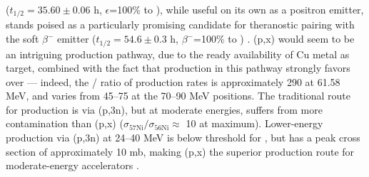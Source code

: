 \documentclass[3p]{elsarticle}
\begin{document}
 ($t_{1/2}=35.60\pm0.06$ h, $\epsilon$=100\% to  \cite{Bhat1998}), while useful on its own as a positron emitter, stands poised as a particularly promising candidate for theranostic pairing with the soft $\beta^-$ emitter  ($t_{1/2}=54.6\pm0.3$ h, $\beta^-$=100\% to  \cite{Browne2010a}) \cite{PMID:7632762,zweit1996medium,Graves2016,Rosch2014}. 
(p,x) would seem to be an intriguing production pathway, due to the ready availability of Cu metal as target, combined with the fact that production in this pathway strongly favors  over  --- indeed, the / 
ratio of production rates is approximately 290 at 61.58 MeV, and varies from 45--75 at the 70--90 MeV positions.
The traditional route for  production is via (p,3n), but at moderate energies, suffers from more   contamination than (p,x)  ($\sigma_\text{57Ni} / \sigma_\text{56Ni}\approx$ 10 at maximum).
Lower-energy production via (p,3n) at 24--40 MeV is below threshold for , but has a peak cross section of approximately 10 mb, making (p,x) the superior production route for moderate-energy accelerators  \cite{MICHEL1997153,Ditrói2013}.
\end{document}
